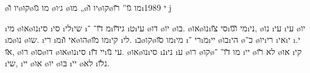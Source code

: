 \textheader%
{\o{יו} \u{ו}\o{קו}\o{מו} \u{גו}}%
{\o{ג׳ו} }%
{\o{מו} }%
{„\o{יו} \u{ו}\o{קו}\o{מו} \u{גו}”}%
{}%
{\u{רו}\i{י}}%
{1989}
j

\i{מי} \o{או}\o{נו}\i{סי} \i{סי}  \i{לי}\i{שי} \i{מ}   \u{דו}־  ־\i{גי}\u{דו} \i{ט}\i{עי} \o{דו} \o{יו} \o{בו}. \o{או}\o{נו}\i{סי} \u{צו}\i{מי} \u{ו}\u{גו}\i{ני}, \o{נו}  \i{עי}  \i{עי} \o{יו} \i{מ}\o{נו}  \o{שו}.   \i{רי} \i{מ}\i{אי} \u{ו}\o{הו}\o{מו} \u{מו}\i{קי} \i{לי}. \i{ב}\o{קו}\o{מו} \u{סו}\i{מי} \i{רי} ־\i{מ}\i{יי} \o{בו}\i{הי} \o{כ}־   \o{יו}\i{רי} \i{אי}\i{י}   \i{י}. \u{או}, \o{רו} \o{סו}\o{דו}  \o{או}\o{נו}\i{סי} \i{יי}  \u{דו}\i{עי} \u{נו}. \o{או}\o{נו}\i{סי} \i{נ}\i{ני} \i{ע} \o{רו} \o{קו}\o{מו}   \u{דו}־ ־ \i{יי} \o{לא} \u{רו} \o{או} \i{קי} \i{שי}, \i{יי} \o{או}   \o{יו} \o{בּו} \i{יי} \o{לא} \i{נ}\u{לו}.

